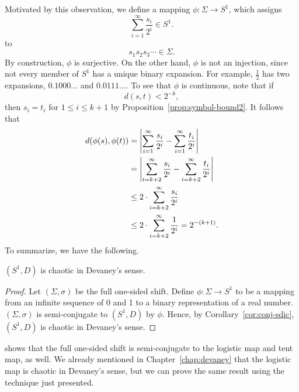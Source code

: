 \documentclass[10pt,twoside]{book}
\begin{document}
Motivated by this observation, we define a mapping $\phi: \Sigma \to S^1$, which assigns
\begin{equation*}
  \sum\limits_{i = 1}^{\infty} \frac{s_i}{2^i} \in S^1.
\end{equation*}
to
\begin{equation*}
  s_1 s_2 s_3 \cdots \in \Sigma.
\end{equation*}
By construction, $\phi$ is surjective.
On the other hand, $\phi$ is not an injection, since not every member of $S^1$ has a unique binary expansion. 
For example, $\frac{1}{2}$ has two expansions, $0.1000\ldots$ and $0.0111\ldots$.
To see that $\phi$ is continuous, note that if
\begin{equation*}
  d(s,t) < 2^{-k},
\end{equation*}
then $s_i = t_i$ for $1 \leq i \leq k+1$ by Proposition~\ref{prop:symbol-bound2}.
It follows that
\begin{align*}
  d(\phi(s), \phi(t))
  &= \left |  \sum\limits_{i=1}^{\infty} \frac{s_i}{2^i} - \sum\limits_{i=1}^{\infty} \frac{t_i}{2^i}  \right | \\
  &= \left |  \sum\limits_{i=k+2}^{\infty} \frac{s_i}{2^i} - \sum\limits_{i=k+2}^{\infty} \frac{t_i}{2^i}  \right | \\
  &\leq 2 \cdot \sum\limits_{i=k+2}^{\infty} \frac{s_i}{2^i}  \\
  &\leq 2 \cdot \sum\limits_{i=k+2}^{\infty} \frac{1}{2^i}
  = 2^{-(k+1)}.
\end{align*}
To summarize, we have the following.
\begin{theorem}
  $(S^1, D)$ is chaotic in Devaney's sense.
  \begin{proof}
    Let $(\Sigma, \sigma)$ be the full one-sided shift.
    Define $\phi: \Sigma \to S^1$ to be a mapping from an infinite sequence of 0 and 1 to a binary representation of a real number.
    $(\Sigma, \sigma)$ is semi-conjugate to $(S^1, D)$ by $\phi$.
    Hence, by Corollary~\ref{cor:conj-sdic}, $(S^1, D)$ is chaotic in Devaney's sense.
  \end{proof}
\end{theorem}
\citet[Chap.4]{sternberg} shows that the full one-sided shift is semi-conjugate to the logistic map and tent map, as well.
We already mentioned in Chapter~\ref{chap:devaney} that the logistic map is chaotic in Devaney's sense, but we can prove the same result using the technique just presented.
\end{document}
